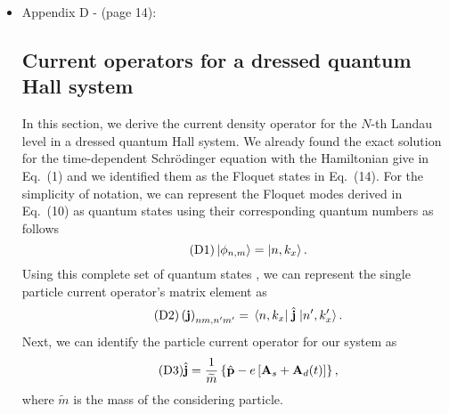 \documentclass{article}
\begin{document}
\begin{itemize}
  \item Appendix D - (page 14):\\
  {\color{Maroon}
  \subsection*{\label{appendix_d}Current operators for a dressed quantum Hall system}

  In this section, we derive the current density operator for the $N$-th Landau level in a dressed quantum Hall system. We already found the exact solution for the time-dependent Schrödinger equation with the Hamiltonian give in Eq.~(1) and we identified them as the Floquet states in Eq.~(14). For the simplicity of notation, we can represent the Floquet modes derived in Eq.~(10) as quantum states using their corresponding quantum numbers as follows
  \begin{equation} \tag{D1}
    \ket{\phi_{n,m}} = \ket{n,k_x}.
  \end{equation}
  Using this complete set of quantum states \cite{wackerl20,holthaus15,grifoni98}, we can represent the single particle current operator's matrix element as
  \begin{equation} \tag{D2}
    \left(\vb{j} \right)_{nm,n'm'} = \mel{n,k_x}{\;\hat{\vb{j}}\;}{n',k'_x}.
  \end{equation}
  Next, we can identify the particle current operator for our system \cite{mahan00,bruus04} as
  \begin{equation} \tag{D3}
    \hat{\vb{j}} = \frac{1}{\widetilde{m}} \left\{\hat{\vb{p}} - e\left[\vb{A}_s + \vb{A}_d(t) \right]\right\},
  \end{equation}
  where $\widetilde{m}$ is the mass of the considering particle.

}
\end{itemize}
\end{document}

